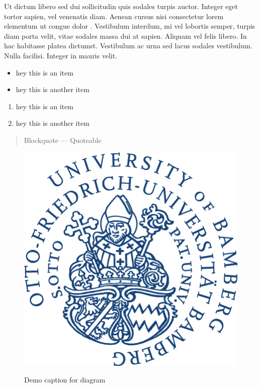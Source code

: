 Ut dictum libero sed dui sollicitudin quis sodales turpis auctor.
Integer eget tortor sapien, vel venenatis diam. Aenean cursus nisi
consectetur lorem elementum ut congue dolor . Vestibulum interdum, mi
vel lobortis semper, turpis diam porta velit, vitae sodales massa dui at
sapien. Aliquam vel felis libero. In hac habitasse platea dictumst.
Vestibulum ac urna sed lacus sodales vestibulum. Nulla facilisi. Integer
in mauris velit.

\begin{itemize}
\item
  hey this is an item
\item
  hey this is another item
\end{itemize}

\begin{enumerate}
\item
  hey this is an item
\item
  hey this is another item
\end{enumerate}

\begin{quote}
Blockquote --- Quoteable
\end{quote}

\begin{figure}[H]
  \centering
    \includegraphics[scale=0.6]{contents/image/logo.png}
  \label{fig:component-http}
  \caption{Demo caption for diagram}
\end{figure}

